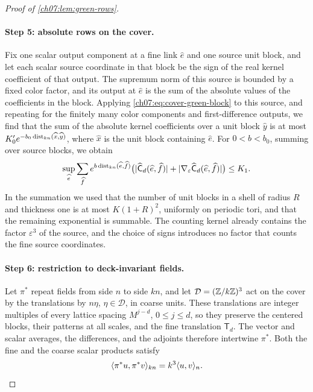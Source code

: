 \begin{proof}[Proof of \cref{ch07:lem:green-rows}]
\paragraph{Step 5: absolute rows on the cover.}
Fix one scalar output component at a fine link $\widehat e$ and one source unit block, and let each scalar source coordinate in that block be the sign of the real kernel coefficient of that output. The supremum norm of this source is bounded by a fixed color factor, and its output at $\widehat e$ is the sum of the absolute values of the coefficients in the block. Applying \eqref{ch07:eq:cover-green-block} to this source, and repeating for the finitely many color components and first-difference outputs, we find that the sum of the absolute kernel coefficients over a unit block $\widehat y$ is at most $K_0'e^{-b_0\operatorname{dist}_{kn}(\widehat x,\widehat y)}$, where $\widehat x$ is the unit block containing $\widehat e$. For $0<b<b_0$, summing over source blocks, we obtain
\begin{equation}\label{ch07:eq:cover-green-row}
 \sup_{\widehat e}\sum_{\widehat f}
 e^{b\operatorname{dist}_{kn}(\widehat e,\widehat f)}
 \bigl(\lvert \widehat{\mathsf C}_d(\widehat e,\widehat f)\rvert
       +\lvert \nabla_\varepsilon\widehat{\mathsf C}_d(\widehat e,\widehat f)\rvert\bigr)\le K_1.
\end{equation}
In the summation we used that the number of unit blocks in a shell of radius $R$ and thickness one is at most $K(1+R)^2$, uniformly on periodic tori, and that the remaining exponential is summable. The counting kernel already contains the factor $\varepsilon^3$ of the source, and the choice of signs introduces no factor that counts the fine source coordinates.

\paragraph{Step 6: restriction to deck-invariant fields.}
Let $\pi^*$ repeat fields from side $n$ to side $kn$, and let $\mathcal D=(\mathbb Z/k\mathbb Z)^3$ act on the cover by the translations by $n\eta$, $\eta\in\mathcal D$, in coarse units. These translations are integer multiples of every lattice spacing $M^{j-d}$, $0\le j\le d$, so they preserve the centered blocks, their patterns at all scales, and the fine translation $\mathsf T_d$. The vector and scalar averages, the differences, and the adjoints therefore intertwine $\pi^*$. Both the fine and the coarse scalar products satisfy
\begin{equation}\label{ch07:eq:cover-inner-product}
 \langle \pi^*u,\pi^*v\rangle_{kn}=k^3\langle u,v\rangle_n .
\end{equation}


\end{proof}
